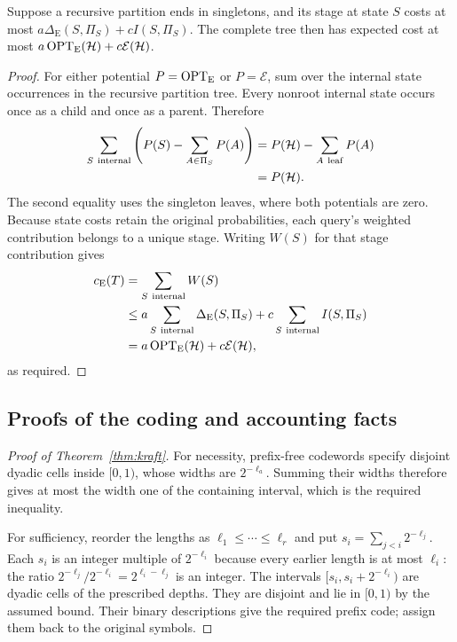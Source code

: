 \begin{proposition}
\label{prop:potential-cancellation}
Suppose a recursive partition ends in singletons, and its stage at
state $S$ costs at most
$a\Delta_{\mathrm E}(S,\Pi_S)+cI(S,\Pi_S)$.
The complete tree then has expected cost at most
$a\operatorname{OPT}_{\mathrm E}(\mathcal H)+c\mathcal E(\mathcal H)$.
\end{proposition}
\begin{proof}
For either potential $P=\operatorname{OPT}_{\mathrm E}$ or $P=\mathcal E$, sum
over the internal state occurrences in the recursive partition tree.
Every nonroot internal state occurs once as a child and once as a
parent. Therefore
\[
\begin{aligned}
 \sum_{S\ {\rm internal}}
       \left(P(S)-\sum_{A\in\Pi_S}P(A)\right)
 &=P(\mathcal H)-\sum_{A\ {\rm leaf}}P(A)\\
 &=P(\mathcal H).
\end{aligned}
\]
The second equality uses the singleton leaves, where both potentials
are zero. Because state costs retain the original probabilities,
each query's weighted contribution belongs to a unique stage.
Writing $W(S)$ for that stage contribution gives
\[
\begin{aligned}
 c_{\mathrm E}(T)
 &=\sum_{S\ {\rm internal}}W(S)\\
 &\le a\sum_{S\ {\rm internal}}\Delta_{\mathrm E}(S,\Pi_S)
       +c\sum_{S\ {\rm internal}}I(S,\Pi_S)\\
 &=a\operatorname{OPT}_{\mathrm E}(\mathcal H)+c\mathcal E(\mathcal H),
\end{aligned}
\]
as required.
\end{proof}

\subsection{Proofs of the coding and accounting facts}

\begin{proof}[Proof of Theorem~\ref{thm:kraft}]
For necessity, prefix-free codewords specify disjoint dyadic cells
inside $[0,1)$, whose widths are $2^{-\ell_a}$. Summing their
widths therefore gives at most the width one of the containing
interval, which is the required inequality.

For sufficiency, reorder the lengths as
$\ell_1\le\cdots\le\ell_r$ and put
$s_i=\sum_{j<i}2^{-\ell_j}$. Each $s_i$ is an integer multiple
of $2^{-\ell_i}$ because every earlier length is at most $\ell_i$:
the ratio $2^{-\ell_j}/2^{-\ell_i}=2^{\ell_i-\ell_j}$ is an
integer. The intervals $[s_i,s_i+2^{-\ell_i})$ are dyadic cells
of the prescribed depths. They are disjoint and lie in $[0,1)$
by the assumed bound. Their binary descriptions give the required
prefix code; assign them back to the original symbols.
\end{proof}

